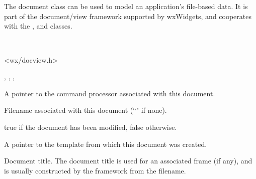 \section{}\label{wxdocument}

The document class can be used to model an application's file-based
data. It is part of the document/view framework supported by wxWidgets,
and cooperates with the , \rtfsp
and  classes.


\\


<wx/docview.h>


, ,\rtfsp
{}, 




A pointer to the command processor associated with this document.



Filename associated with this document (``" if none).



true if the document has been modified, false otherwise.



A pointer to the template from which this document was created.



Document title. The document title is used for an associated
frame (if any), and is usually constructed by the framework from
the filename.

